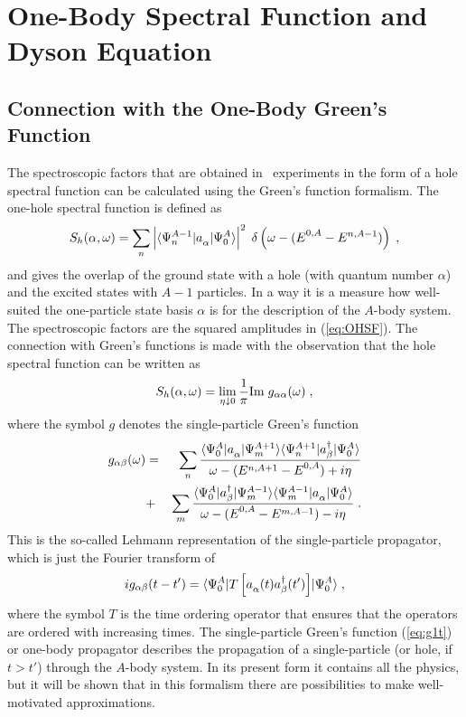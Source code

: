 \section{One-Body Spectral Function and Dyson Equation}

\subsection{Connection with the One-Body Green's Function}
The spectroscopic factors that are obtained in \eep\ experiments in the form 
of a hole spectral function can be 
calculated using the Green's function formalism. 
The one-hole spectral function is defined as
%
	\begin{equation}
		S_h(\alpha,\omega)
	=
		\sum_n
		\left|
			\ME< \Psi^{A-1}_n | \Oa{\alpha} | \Psi^A_0 >
		\right|^2
	\;
		\delta\left(\omega - (\EnulA - E^{n,A-1})\right)
	\;,
	\label{eq:OHSF}
	\end{equation}
%
and gives the overlap of the ground state with a hole (with quantum number 
$\alpha$) and the excited states 
with $A-1$ particles. In a way it is a measure how well-suited 
the one-particle state basis $\alpha$ is for the description of the $A$-body 
system. The spectroscopic factors are the squared amplitudes in 
(\ref{eq:OHSF}). 
The connection with Green's functions is made with the observation that 
the hole spectral function can be written as
%
	\begin{equation}
		S_h(\alpha,\omega)
	=
		\lim_{\eta \downarrow 0}
		\frac{1}{\pi}
		{\rm Im}\;
		g_{\alpha\alpha}(\omega)
	\;,
	\end{equation}
%
where the symbol $g$ denotes the single-particle Green's function 
%
	\begin{eqnarray}
		g_{\alpha\beta}(\omega)
	&=&
		\sum_{n}
		\frac{
		\ME<\Psi^A_0| \Oa{\alpha} | \Psi_m^{A+1} >
		\ME<\Psi_n^{A+1}| \Oc{\beta} | \Psi^A_0 >
		}{ \omega - (E^{n,A+1}- \EnulA) + i \eta }
	\nonumber \\
	&+&
		\sum_{m}
		\frac{
		\ME<\Psi^A_0| \Oc{\beta} | \Psi_m^{A-1} >
		\ME<\Psi_m^{A-1}| \Oa{\alpha} | \Psi^A_0 >
		}{ \omega - (\EnulA - E^{m,A-1}) - i \eta }
	\label{eq:g1} 
	\;.
	\end{eqnarray}
%
This is the so-called Lehmann representation of the single-particle propagator,
which is just the Fourier transform of 
%
	\begin{equation}
		ig_{\alpha\beta}(t-t')
	=
		\ME< \Psi^A_0 | 
		T\left[
			\Oa{\alpha}(t) \Oc{\beta}(t') 
		\right]
		| \Psi^A_0 > 
	\label{eq:g1t}
	\;,
	\end{equation}
%
where the symbol $T$ is the time ordering operator that ensures that the
operators are ordered with increasing times\cite{FW71}.
The single-particle Green's function (\ref{eq:g1t}) or one-body propagator 
describes the propagation of a single-particle (or hole, if 
$t > t'$) through the $A$-body system. In its present form it 
contains all the physics, but it will be shown that in this formalism
there are possibilities to make well-motivated approximations.

